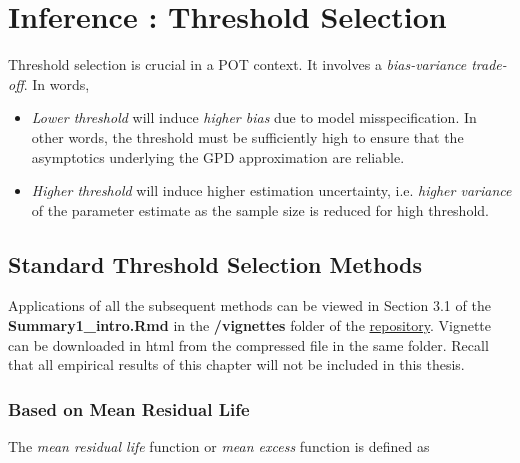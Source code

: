 \section{Inference : Threshold Selection }\label{sec:thresh_selec}

Threshold selection is crucial in a POT context.
It involves a \emph{bias-variance trade-off}. In words,

\begin{itemize}
	\item \emph{Lower threshold} will induce\emph{ higher bias} due to model misspecification. In other words, the threshold must be sufficiently high to ensure that the asymptotics underlying the GPD approximation are reliable.
	
	\item \emph{Higher threshold} will induce higher estimation uncertainty, i.e. \emph{higher variance} of the parameter estimate as the sample size is reduced for high threshold. 
	
\end{itemize}



\subsection{Standard Threshold Selection Methods}


Applications of all the subsequent methods can be viewed in Section 3.1 of the \textbf{Summary1\_intro.Rmd} in the \textbf{/vignettes} folder of the \href{https://github.com/proto4426/PissoortThesis/tree/master/vignettes}{repository}. %
 Vignette can be downloaded in html from the compressed file in the same folder. Recall that all empirical results of this chapter will not be included in this thesis.

\subsubsection*{Based on Mean Residual Life}
 The \emph{mean residual life} function or \emph{mean excess} function is defined as

